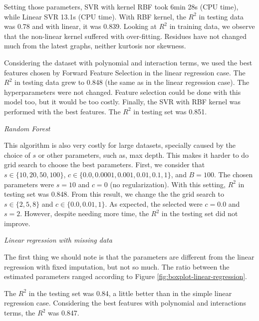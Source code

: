 Setting those parameters, SVR with kernel RBF took 6min 28s (CPU time), while
Linear SVR 13.1s (CPU time). With RBF kernel, the $R^2$ in testing data was 0.78 and
with linear, it was 0.839. Looking at $R^2$ in training data, we observe that
the non-linear kernel suffered with over-fitting. Residues have not changed
much from the latest graphs, neither kurtosis nor skewness.

Considering the dataset with polynomial and interaction terms, we used the
best features chosen by Forward Feature Selection in the linear regression case. The
$R^2$ in testing data grew to 0.848 (the same as in the linear regression
case). The hyperparameters were not changed. Feature selection could be done with this model too, but it would be
too costly. Finally, the SVR with RBF kernel was performed with the best
features. The $R^2$ in testing set was 0.851. 

\vspace{2mm}

{\em Random Forest} 

\vspace{2mm}

This algorithm is also very costly for large datasets, specially caused by the
choice of $s$ or other parameters, such as, max depth. This makes it harder to
do grid search to choose the best parameters. First, we consider that $s \in
\{10, 20, 50, 100\}$, $c \in \{0.0, 0.0001, 0.001, 0.01, 0.1, 1\}$, and $B =
100$. The chosen parameters were $s = 10$ and $c = 0$ (no regularization).
With this setting, $R^2$ in testing set was 0.848. From this result, we change
the the grid search to $s \in
\{2, 5, 8\}$ and $c \in \{0.0, 0.01, 1\}$. As expected, the selected were $c =
0.0$ and $s = 2$. However, despite needing more time, the $R^2$ in the testing
set did not improve. 

\vspace{2mm}

{\em Linear regression with missing data} 

\vspace{2mm}

The first thing we should note is that the parameters are different from
the linear regression with fixed imputation, but not so much. The ratio
between the estimated parameters ranged according to Figure
\ref{fig:boxplot-linear-regression}. 

The $R^2$ in the testing set was 0.84, a little better than in the simple
linear regression case. Considering the best features with polynomial and
interactions terms, the $R^2$ was 0.847.


